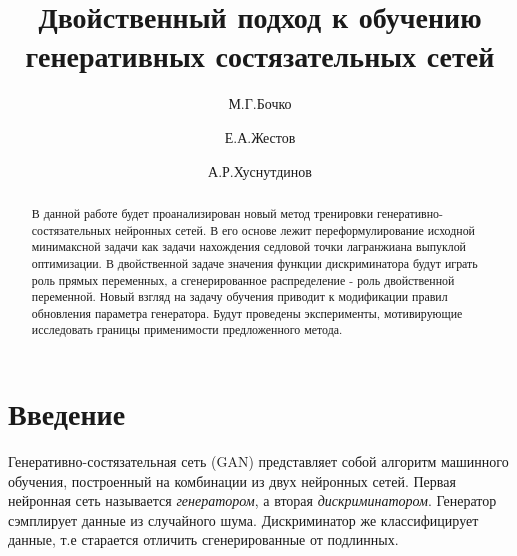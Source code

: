 \documentclass[preprint,12pt]{elsarticle}
\begin{document}
\begin{frontmatter}

\title{Двойственный подход к обучению генеративных состязательных сетей}


\author{М.Г.Бочко}
\author{Е.А.Жестов}
\author{А.Р.Хуснутдинов}

\address{Московский физико-технический институт (национальный исследовательский университет)}

\address{141701, Московская область, г. Долгопрудный, Институтский переулок, д.9.}

\begin{abstract}

В данной работе будет проанализирован новый метод тренировки генеративно-состязательных нейронных сетей. В его основе  лежит переформулирование исходной минимаксной задачи как задачи нахождения седловой точки лагранжиана выпуклой оптимизации. В двойственной задаче значения функции дискриминатора будут играть роль прямых переменных, а  сгенерированное распределение - роль двойственной переменной. 
Новый взгляд на задачу обучения приводит к модификации правил обновления параметра генератора. Будут проведены эксперименты, мотивирующие исследовать границы применимости предложенного метода.    

\end{abstract}




\end{frontmatter}

\linenumbers

\section{Введение}
\label{S:1}

Генеративно-состязательная сеть (GAN) представляет собой  алгоритм машинного обучения, построенный на комбинации из двух нейронных сетей.  
Первая нейронная сеть называется \textit{генератором}, а вторая \textit{дискриминатором}. Генератор сэмплирует данные из случайного шума. Дискриминатор же классифицирует данные, т.е старается отличить сгенерированные от подлинных. 
\end{document}

